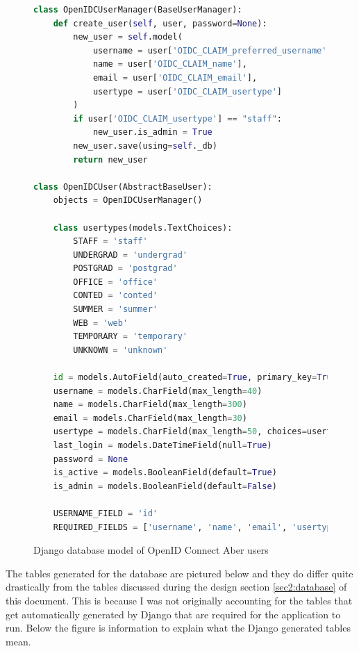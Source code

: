 \begin{figure}[H]
\begin{lstlisting}[language=Python]
class OpenIDCUserManager(BaseUserManager):
    def create_user(self, user, password=None):
        new_user = self.model(
            username = user['OIDC_CLAIM_preferred_username'],
            name = user['OIDC_CLAIM_name'],
            email = user['OIDC_CLAIM_email'],
            usertype = user['OIDC_CLAIM_usertype']
        )
        if user['OIDC_CLAIM_usertype'] == "staff":
            new_user.is_admin = True
        new_user.save(using=self._db)
        return new_user

class OpenIDCUser(AbstractBaseUser):
    objects = OpenIDCUserManager()

    class usertypes(models.TextChoices):
        STAFF = 'staff'
        UNDERGRAD = 'undergrad'
        POSTGRAD = 'postgrad'
        OFFICE = 'office'
        CONTED = 'conted'
        SUMMER = 'summer'
        WEB = 'web'
        TEMPORARY = 'temporary'
        UNKNOWN = 'unknown'

    id = models.AutoField(auto_created=True, primary_key=True, serialize=False)
    username = models.CharField(max_length=40)
    name = models.CharField(max_length=300)
    email = models.CharField(max_length=30)
    usertype = models.CharField(max_length=50, choices=usertypes.choices)
    last_login = models.DateTimeField(null=True)
    password = None
    is_active = models.BooleanField(default=True)
    is_admin = models.BooleanField(default=False)

    USERNAME_FIELD = 'id'
    REQUIRED_FIELDS = ['username', 'name', 'email', 'usertype']
\end{lstlisting}
\caption{Django database model of OpenID Connect Aber users}
\label{fig:django-database-code}
\end{figure}

The tables generated for the database are pictured below and they do differ quite drastically from the tables discussed during the design section \ref{sec2:database} of this document. This is because I was not originally accounting for the tables that get automatically generated by Django \cite{Django} that are required for the application to run. Below the figure is information to explain what the Django generated tables mean.

